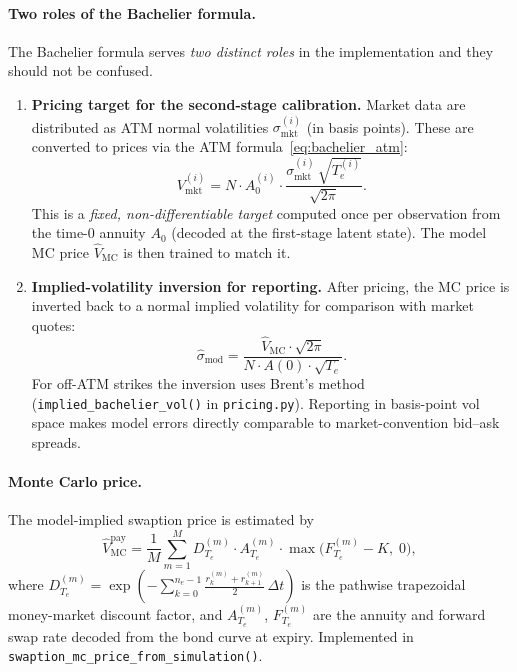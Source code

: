 \paragraph{Two roles of the Bachelier formula.}
The Bachelier formula serves \emph{two distinct roles} in the implementation and they
should not be confused.

\begin{enumerate}
    \item \textbf{Pricing target for the second-stage calibration.}
    Market data are distributed as ATM normal volatilities
    $\sigma^{(i)}_{\mathrm{mkt}}$ (in basis points). These are converted to prices via
    the ATM formula~\eqref{eq:bachelier_atm}:
    \begin{equation}
        V^{(i)}_{\mathrm{mkt}}
        =
        N \cdot A^{(i)}_0 \cdot
        \frac{\sigma^{(i)}_{\mathrm{mkt}}\,\sqrt{T_e^{(i)}}}{\sqrt{2\pi}}.
        \label{eq:stage2_target}
    \end{equation}
    This is a \emph{fixed, non-differentiable target} computed once per observation from
    the time-$0$ annuity $A_0$ (decoded at the first-stage latent state). The model MC
    price $\hat{V}_{\mathrm{MC}}$ is then trained to match it.

    \item \textbf{Implied-volatility inversion for reporting.}
    After pricing, the MC price is inverted back to a normal implied volatility for
    comparison with market quotes:
    \begin{equation}
        \hat{\sigma}_{\mathrm{mod}}
        =
        \frac{\hat{V}_{\mathrm{MC}} \cdot \sqrt{2\pi}}{N \cdot A(0) \cdot \sqrt{T_e}}.
        \label{eq:implied_vol}
    \end{equation}
    For off-ATM strikes the inversion uses Brent's method
    (\texttt{implied\_bachelier\_vol()} in \texttt{pricing.py}). Reporting in basis-point
    vol space makes model errors directly comparable to market-convention bid--ask
    spreads.
\end{enumerate}

\paragraph{Monte Carlo price.}
The model-implied swaption price is estimated by
\begin{equation}
    \hat{V}^{\mathrm{pay}}_{\mathrm{MC}}
    =
    \frac{1}{M}
    \sum_{m=1}^{M}
    D^{(m)}_{T_e} \cdot A^{(m)}_{T_e} \cdot
    \max\!\bigl(F^{(m)}_{T_e} - K,\; 0\bigr),
    \label{eq:mc_price}
\end{equation}
where $D^{(m)}_{T_e}=\exp(-\sum_{k=0}^{n_e-1}\tfrac{r^{(m)}_k+r^{(m)}_{k+1}}{2}\,\Delta t)$
is the pathwise trapezoidal money-market discount factor, and $A^{(m)}_{T_e}$,
$F^{(m)}_{T_e}$ are the annuity and forward swap rate decoded from the bond curve at
expiry. Implemented in \texttt{swaption\_mc\_price\_from\_simulation()}.

